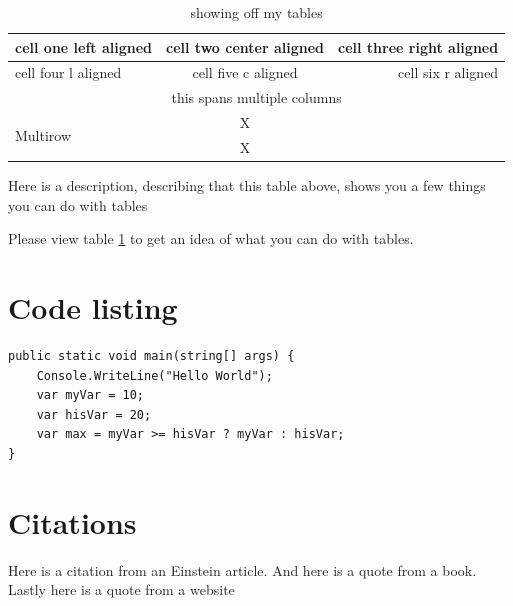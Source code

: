 \documentclass{report}
\begin{document}
\begin{center}
\begin{table}[h]
\caption{\label{tab: Table showoff} showing off my tables}
\begin{tabular}{ |l|c|r| } 
 \hline
 cell one left aligned & cell two center aligned & cell three right aligned \\ 
 \hline
 cell four l aligned & cell five c aligned & cell six r aligned \\ 
 \hline
 \multicolumn{3}{|c|}{this spans multiple columns} \\
 \hline
 \multirow{2}{*}{Multirow}&X & \\
 &X &\\
 \hline
\end{tabular}
\medskip

Here is a description, describing that this table above, shows you a few things you can do with tables
\end{table}
\end{center}
Please view table \ref{tab: Table showoff} to get an idea of what you can do with tables.
\section{Code listing}

\begin{lstlisting}[language={[Sharp]C}, caption={C\# exaple}, label={Script}]
public static void main(string[] args) {
	Console.WriteLine("Hello World");
	var myVar = 10;
	var hisVar = 20;
	var max = myVar >= hisVar ? myVar : hisVar;
}
\end{lstlisting}
\section{Citations}
Here is a citation from an Einstein article\cite{einstein}. And here is a quote from a book\cite{latexcompanion}. Lastly here is a quote from a website\cite{knuthwebsite}

	
	
\end{document}
